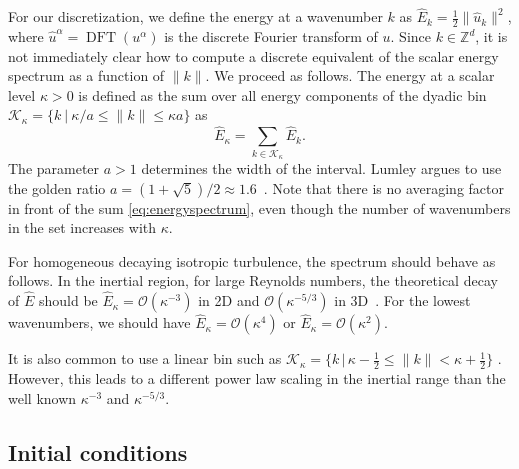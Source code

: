 \documentclass[preprint]{elsarticle}
\begin{document}
For our discretization, we define the energy at a wavenumber $k$ as $\hat{E}_k =
\frac{1}{2} \| \hat{u}_k \|^2$, where $\hat{u}^\alpha =
\operatorname{DFT}(u^\alpha)$ is the discrete Fourier transform of $u$. Since $k
\in \mathbb{Z}^d$, it is not immediately clear how to compute a discrete
equivalent of the scalar energy spectrum as a function of $\| k \|$. We proceed
as follows. The energy at a scalar level $\kappa > 0$ is defined as the sum over
all energy components of the dyadic bin $\mathcal{K}_\kappa = \{ k \ | \ \kappa
/ a \leq \| k \| \leq \kappa a \}$ as
\begin{equation} \label{eq:energyspectrum}
    \hat{E}_\kappa = \sum_{k \in \mathcal{K}_\kappa} \hat{E}_k.
\end{equation}
The parameter $a > 1$ determines the width of the interval. Lumley argues to
use the golden ratio $a = (1 + \sqrt{5}) / 2 \approx 1.6$~\cite{Gatski1996}.
Note that there is no averaging factor in front of the sum
\eqref{eq:energyspectrum}, even though the number of wavenumbers in the set
increases with $\kappa$.

For homogeneous decaying isotropic turbulence, the spectrum should behave as
follows. In the inertial region, for large Reynolds numbers, the theoretical
decay of $\hat{E}$ should be $\hat{E}_\kappa = \mathcal{O}(\kappa^{-3})$ in 2D
and $\mathcal{O}(\kappa^{-5/3})$ in 3D~\cite{Pope2000}. For the lowest
wavenumbers, we should have $\hat{E}_\kappa = \mathcal{O}(\kappa^4)$ or
$\hat{E}_\kappa = \mathcal{O}(\kappa^2)$.

It is also common to use a linear bin such as $\mathcal{K}_\kappa = \{k \, | \,
\kappa - \frac{1}{2} \leq \| k \| < \kappa + \frac{1}{2} \}$
\cite{Orlandi2000,San2012,Maulik2017}. However, this leads to a different power
law scaling in the inertial range than the well known $\kappa^{-3}$ and
$\kappa^{-5/3}$.

\subsection{Initial conditions} \label{sec:ic}
\end{document}
